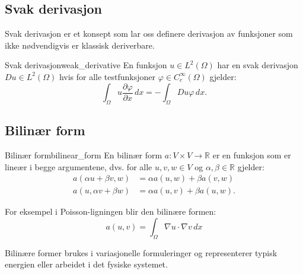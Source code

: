 \documentclass[../../main.tex]{subfiles}
\begin{document}
\subsection{Svak derivasjon}
Svak derivasjon er et konsept som lar oss definere derivasjon av funksjoner som ikke nødvendigvis er klassisk deriverbare.
\begin{definition}{Svak derivasjon}{weak_derivative}
	En funksjon $u \in L^2(\Omega)$ har en svak derivasjon $Du \in L^2(\Omega)$ hvis for alle testfunksjoner $\varphi \in C_c^\infty(\Omega)$ gjelder:
	\[
		\int_\Omega u \frac{\partial \varphi}{\partial x} \, dx = -\int_\Omega Du \varphi \, dx.
	\]
\end{definition}

\subsection{Bilinær form}
\begin{definition}{Bilinær form}{bilinear_form}
	En bilinær form $a: V \times V \to \mathbb{R}$ er en funksjon som er lineær i begge argumentene, dvs. for alle $u,v,w \in V$ og $\alpha, \beta \in \mathbb{R}$ gjelder:
	\begin{align*}
		a(\alpha u + \beta v, w) & = \alpha a(u,w) + \beta a(v,w)  \\
		a(u, \alpha v + \beta w) & = \alpha a(u,v) + \beta a(u,w).
	\end{align*}
\end{definition}

For eksempel i Poisson-ligningen blir den bilinære formen:
\begin{equation}
	a(u,v) = \int_\Omega \nabla u \cdot \nabla v \, dx
\end{equation}

Bilinære former brukes i variasjonelle formuleringer og representerer typisk energien eller arbeidet i det fysiske systemet.
\end{document}
